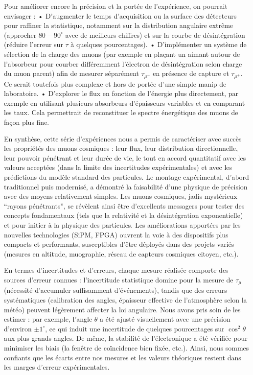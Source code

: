 \documentclass[a4paper,12pt,twoside]{article}
\begin{document}
Pour améliorer encore la précision et la portée de l’expérience, on pourrait envisager :
	•	D’augmenter le temps d’acquisition ou la surface des détecteurs pour raffiner la statistique, notamment sur la distribution angulaire extrême (approcher $80-90^\circ$ avec de meilleurs chiffres) et sur la courbe de désintégration (réduire l’erreur sur $\tau$ à quelques pourcentages).
	•	D’implémenter un système de sélection de la charge des muons (par exemple en plaçant un aimant autour de l’absorbeur pour courber différemment l’électron de désintégration selon charge du muon parent) afin de mesurer séparément $\tau_{\mu^-}$ en présence de capture et $\tau_{\mu^+}$. Ce serait toutefois plus complexe et hors de portée d’une simple manip de laboratoire.
	•	D’explorer le flux en fonction de l’énergie plus directement, par exemple en utilisant plusieurs absorbeurs d’épaisseurs variables et en comparant les taux. Cela permettrait de reconstituer le spectre énergétique des muons de façon plus fine.

En synthèse, cette série d’expériences nous a permis de caractériser avec succès les propriétés des muons cosmiques : leur flux, leur distribution directionnelle, leur pouvoir pénétrant et leur durée de vie, le tout en accord quantitatif avec les valeurs acceptées (dans la limite des incertitudes expérimentales) et avec les prédictions du modèle standard des particules. Le montage expérimental, d’abord traditionnel puis modernisé, a démontré la faisabilité d’une physique de précision avec des moyens relativement simples. Les muons cosmiques, jadis mystérieux “rayons pénétrants”, se révèlent ainsi être d’excellents messagers pour tester des concepts fondamentaux (tels que la relativité et la désintégration exponentielle) et pour initier à la physique des particules. Les améliorations apportées par les nouvelles technologies (SiPM, FPGA) ouvrent la voie à des dispositifs plus compacts et performants, susceptibles d’être déployés dans des projets variés (mesures en altitude, muographie, réseau de capteurs cosmiques citoyen, etc.).

En termes d’incertitudes et d’erreurs, chaque mesure réalisée comporte des sources d’erreur connues : l’incertitude statistique domine pour la mesure de $\tau_\mu$ (nécessité d’accumuler suffisamment d’événements), tandis que des erreurs systématiques (calibration des angles, épaisseur effective de l’atmosphère selon la météo) peuvent légèrement affecter la loi angulaire. Nous avons pris soin de les estimer : par exemple, l’angle $\theta$ a été ajusté visuellement avec une précision d’environ $\pm 1^\circ$, ce qui induit une incertitude de quelques pourcentages sur $\cos^2\theta$ aux plus grands angles. De même, la stabilité de l’électronique a été vérifiée pour minimiser les biais (la fenêtre de coïncidence bien fixée, etc.). Ainsi, nous sommes confiants que les écarts entre nos mesures et les valeurs théoriques restent dans les marges d’erreur expérimentales.
\end{document}
